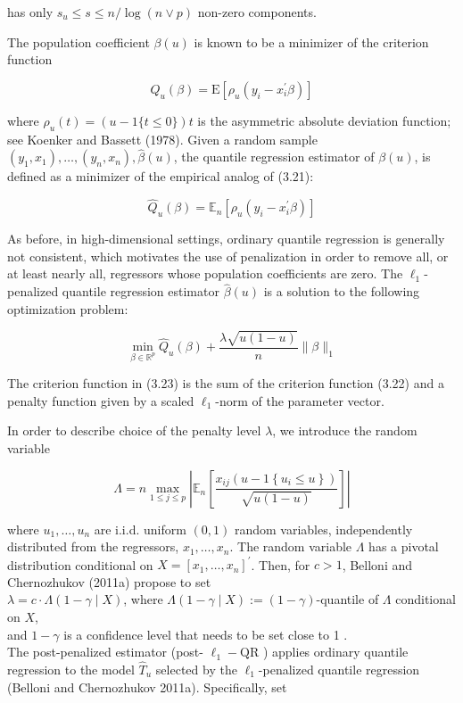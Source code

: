 \documentclass[10pt]{article}
\begin{document}
has only \(s_{u} \leqslant s \leqslant n / \log (n \vee p)\) non-zero components.

The population coefficient \(\beta(u)\) is known to be a minimizer of the criterion function

\[
Q_{u}(\beta)=\mathrm{E}\left[\rho_{u}\left(y_{i}-x_{i}^{\prime} \beta\right)\right]
\]

where \(\rho_{u}(t)=(u-1\{t \leqslant 0\}) t\) is the asymmetric absolute deviation function; see Koenker and Bassett (1978). Given a random sample \(\left(y_{1}, x_{1}\right), \ldots,\left(y_{n}, x_{n}\right), \widehat{\beta}(u)\), the quantile regression estimator of \(\beta(u)\), is defined as a minimizer of the empirical analog of (3.21):

\[
\widehat{Q}_{u}(\beta)=\mathbb{E}_{n}\left[\rho_{u}\left(y_{i}-x_{i}^{\prime} \beta\right)\right]
\]

As before, in high-dimensional settings, ordinary quantile regression is generally not consistent, which motivates the use of penalization in order to remove all, or at least nearly all, regressors whose population coefficients are zero. The \(\ell_{1}\)-penalized quantile regression estimator \(\widehat{\beta}(u)\) is a solution to the following optimization problem:

\[
\min _{\beta \in \mathbb{R}^{p}} \widehat{Q}_{u}(\beta)+\frac{\lambda \sqrt{u(1-u)}}{n}\|\beta\|_{1}
\]

The criterion function in (3.23) is the sum of the criterion function (3.22) and a penalty function given by a scaled \(\ell_{1}\)-norm of the parameter vector.

In order to describe choice of the penalty level \(\lambda\), we introduce the random variable

\[
\Lambda=n \max _{1 \leqslant j \leqslant p}\left|\mathbb{E}_{n}\left[\frac{x_{i j}\left(u-1\left\{u_{i} \leqslant u\right\}\right)}{\sqrt{u(1-u)}}\right]\right|
\]

where \(u_{1}, \ldots, u_{n}\) are i.i.d. uniform \((0,1)\) random variables, independently distributed from the regressors, \(x_{1}, \ldots, x_{n}\). The random variable \(\Lambda\) has a pivotal distribution conditional on \(X=\left[x_{1}, \ldots, x_{n}\right]^{\prime}\). Then, for \(c>1\), Belloni and Chernozhukov (2011a) propose to set\\
\(\lambda=c \cdot \Lambda(1-\gamma \mid X)\), where \(\Lambda(1-\gamma \mid X):=(1-\gamma)\)-quantile of \(\Lambda\) conditional on \(X\),\\
and \(1-\gamma\) is a confidence level that needs to be set close to 1 .\\
The post-penalized estimator (post- \(\ell_{1}-\mathrm{QR}\) ) applies ordinary quantile regression to the model \(\widehat{T}_{u}\) selected by the \(\ell_{1}\)-penalized quantile regression (Belloni and Chernozhukov 2011a). Specifically, set
\end{document}
